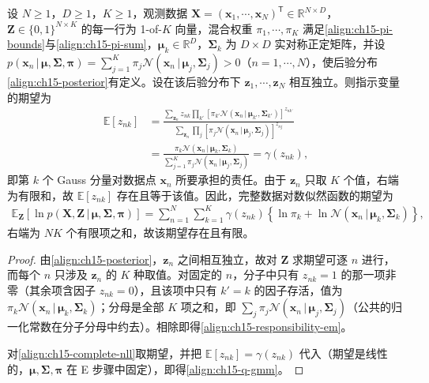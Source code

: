 \documentclass[../../main.tex]{subfiles}
\begin{document}
\begin{proposition}[责任与完整数据对数似然的期望]\label{proposition:ch15-责任与期望}
设 $N\geqslant1$，$D\geqslant1$，$K\geqslant1$，观测数据 $\bm{X}=(\bm{x}_1,\cdots,\bm{x}_N)^{\mathsf T}\in\mathbb{R}^{N\times D}$，$\bm{Z}\in\{0,1\}^{N\times K}$ 的每一行为 1-of-$K$ 向量，混合权重 $\pi_1,\cdots,\pi_K$ 满足\eqref{align:ch15-pi-bounds}与\eqref{align:ch15-pi-sum}，$\bm{\mu}_k\in\mathbb{R}^{D}$，$\bm{\Sigma}_k$ 为 $D\times D$ 实对称正定矩阵，并设 $p(\bm{x}_n\,|\,\bm{\mu},\bm{\Sigma},\bm{\pi})=\sum_{j=1}^{K}\pi_j\mathcal{N}(\bm{x}_n\,|\,\bm{\mu}_j,\bm{\Sigma}_j)>0$（$n=1,\cdots,N$），使后验分布\eqref{align:ch15-posterior}有定义。设在该后验分布下 $\bm{z}_1,\cdots,\bm{z}_N$ 相互独立。则指示变量的期望为
\begin{align}
\mathbb{E}[z_{nk}]
&=\frac{\sum_{\bm{z}_n}z_{nk}\prod_{k'}\left[\pi_{k'}\mathcal{N}(\bm{x}_n\,|\,\bm{\mu}_{k'},\bm{\Sigma}_{k'})\right]^{z_{nk'}}}{\sum_{\bm{z}_n}\prod_{j}\left[\pi_j\mathcal{N}(\bm{x}_n\,|\,\bm{\mu}_j,\bm{\Sigma}_j)\right]^{z_{nj}}}\nonumber\\
&=\frac{\pi_k\mathcal{N}(\bm{x}_n\,|\,\bm{\mu}_k,\bm{\Sigma}_k)}{\sum_{j=1}^{K}\pi_j\mathcal{N}(\bm{x}_n\,|\,\bm{\mu}_j,\bm{\Sigma}_j)}=\gamma(z_{nk}),
\label{align:ch15-responsibility-em}
\end{align}
即第 $k$ 个 Gauss 分量对数据点 $\bm{x}_n$ 所要承担的责任。由于 $\bm{z}_n$ 只取 $K$ 个值，右端为有限和，故 $\mathbb{E}[z_{nk}]$ 存在且等于该值。因此，完整数据对数似然函数的期望为
\begin{align}
\mathbb{E}_{\bm{Z}}\!\left[\ln p(\bm{X},\bm{Z}\,|\,\bm{\mu},\bm{\Sigma},\bm{\pi})\right]=\sum_{n=1}^{N}\sum_{k=1}^{K}\gamma(z_{nk})\!\left\{\ln\pi_k+\ln\mathcal{N}(\bm{x}_n\,|\,\bm{\mu}_k,\bm{\Sigma}_k)\right\},
\label{align:ch15-q-gmm}
\end{align}
右端为 $NK$ 个有限项之和，故该期望存在且有限。
\end{proposition}
\begin{proof}
由\eqref{align:ch15-posterior}，$\bm{z}_n$ 之间相互独立，故对 $\bm{Z}$ 求期望可逐 $n$ 进行，而每个 $n$ 只涉及 $\bm{z}_n$ 的 $K$ 种取值。对固定的 $n$，分子中只有 $z_{nk}=1$ 的那一项非零（其余项含因子 $z_{nk}=0$），且该项中只有 $k'=k$ 的因子存活，值为 $\pi_k\mathcal{N}(\bm{x}_n\,|\,\bm{\mu}_k,\bm{\Sigma}_k)$；分母是全部 $K$ 项之和，即 $\sum_j\pi_j\mathcal{N}(\bm{x}_n\,|\,\bm{\mu}_j,\bm{\Sigma}_j)$（公共的归一化常数在分子分母中约去）。相除即得\eqref{align:ch15-responsibility-em}。

对\eqref{align:ch15-complete-nll}取期望，并把 $\mathbb{E}[z_{nk}]=\gamma(z_{nk})$ 代入（期望是线性的，$\bm{\mu},\bm{\Sigma},\bm{\pi}$ 在 E 步骤中固定），即得\eqref{align:ch15-q-gmm}。
\end{proof}
\end{document}
